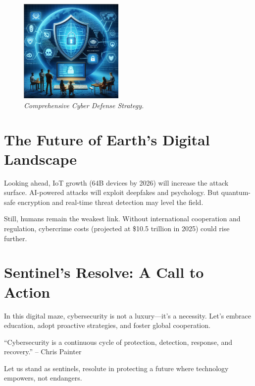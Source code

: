 \begin{figure}[h]
  \centering
  \includegraphics[width=0.45\textwidth]{security.png}
  \caption{\textit{Comprehensive Cyber Defense Strategy.}}
\end{figure}

\section*{The Future of Earth’s Digital Landscape}
Looking ahead, IoT growth (64B devices by 2026) will increase the attack surface. AI-powered attacks will exploit deepfakes and psychology. But quantum-safe encryption and real-time threat detection may level the field.

Still, humans remain the weakest link. Without international cooperation and regulation, cybercrime costs (projected at \$10.5 trillion in 2025) could rise further.

\section*{Sentinel’s Resolve: A Call to Action}
In this digital maze, cybersecurity is not a luxury—it’s a necessity. Let’s embrace education, adopt proactive strategies, and foster global cooperation.

\begin{quoting}
``Cybersecurity is a continuous cycle of protection, detection, response, and recovery.'' -- Chris Painter
\end{quoting}

Let us stand as sentinels, resolute in protecting a future where technology empowers, not endangers.

